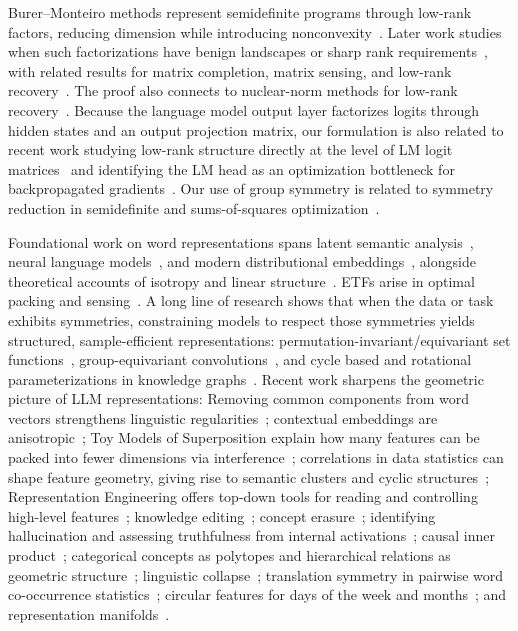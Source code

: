 \documentclass[11pt]{article}
\begin{document}
Burer--Monteiro methods represent semidefinite programs through low-rank factors, reducing dimension while introducing nonconvexity~\citep{burer2003nonlinear,burer2005local}. Later work studies when such factorizations have benign landscapes or sharp rank requirements~\citep{boumal2016non,waldspurger2020rank}, with related results for matrix completion, matrix sensing, and low-rank recovery~\citep{sun2016guaranteed,ge2016matrix}. The proof also connects to nuclear-norm methods for low-rank recovery~\citep{recht2010guaranteed}. Because the language model output layer factorizes logits through hidden states and an output projection matrix, our formulation is also related to recent work studying low-rank structure directly at the level of LM logit matrices~\citep{golowich2025sequences} and identifying the LM head as an optimization bottleneck for backpropagated gradients~\citep{godey2026lmhead}. Our use of group symmetry is related to symmetry reduction in semidefinite and sums-of-squares optimization~\citep{gatermann2004symmetry,deklerk2010exploiting,deklerk2010qap}.

Foundational work on word representations spans latent semantic analysis~\citep{deerwester1990indexing}, neural language models~\citep{bengio2003neural}, and modern distributional embeddings~\citep{mikolov2013distributed,pennington2014glove,levy2014neural}, alongside theoretical accounts of isotropy and linear structure~\citep{arora2016latent}. ETFs arise in optimal packing and sensing~\citep{strohmer2003grassmannian}. A long line of research shows that when the data or task exhibits symmetries, constraining models to respect those symmetries yields structured, sample-efficient representations: permutation-invariant/equivariant set functions~\citep{zaheer2017deep}, group-equivariant convolutions~\citep{cohen2016group}, and cycle based and rotational parameterizations in knowledge graphs~\citep{sun2019rotate}. Recent work sharpens the geometric picture of LLM representations: Removing common components from word vectors strengthens linguistic regularities~\citep{mu2017all}; contextual embeddings are anisotropic~\citep{ethayarajh2019contextual}; Toy Models of Superposition explain how many features can be packed into fewer dimensions via interference~\citep{elhage2022toy}; correlations in data statistics can shape feature geometry, giving rise to semantic clusters and cyclic structures~\citep{prieto2026data}; Representation Engineering offers top-down tools for reading and controlling high-level features~\citep{zou2023representation}; knowledge editing~\citep{zhong2023mquake}; concept erasure~\citep{belrose2023leace}; identifying hallucination and assessing truthfulness from internal activations~\citep{burns2022discovering,azaria2023internal}; causal inner product~\citep{park2023linear}; categorical concepts as polytopes and hierarchical relations as geometric structure~\citep{park2025categorical}; linguistic collapse~\citep{wu2024linguistic}; translation symmetry in pairwise word co-occurrence statistics~\citep{karkada2026symmetry}; circular features for days of the week and months~\citep{engels2025not}; and representation manifolds~\citep{modell2025origins}.
\end{document}
